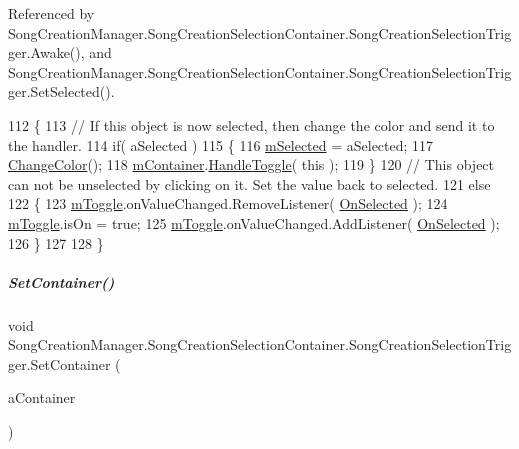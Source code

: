 Referenced by Song\+Creation\+Manager.\+Song\+Creation\+Selection\+Container.\+Song\+Creation\+Selection\+Trigger.\+Awake(), and Song\+Creation\+Manager.\+Song\+Creation\+Selection\+Container.\+Song\+Creation\+Selection\+Trigger.\+Set\+Selected().


\begin{DoxyCode}
112             \{
113                 \textcolor{comment}{// If this object is now selected, then change the color and send it to the handler.}
114                 \textcolor{keywordflow}{if}( aSelected )
115                 \{
116                     \hyperlink{group___s_c_m_nest_class_a1a8086defe08acc773bdc9385a9f66d2}{mSelected} = aSelected;
117                     \hyperlink{group___s_c_m_nest_class_a26bd7667a86c8dc85429a5e4798dd30a}{ChangeColor}();
118                     \hyperlink{group___s_c_m_nest_class_aae8ebcbfe18ad8706d11edac54f2da87}{mContainer}.\hyperlink{group___s_c_m_nest_class_a534fec983fb7e5a7f948513672aa64b4}{HandleToggle}( \textcolor{keyword}{this} );
119                 \}
120                 \textcolor{comment}{// This object can not be unselected by clicking on it. Set the value back to selected.}
121                 \textcolor{keywordflow}{else}
122                 \{
123                     \hyperlink{group___s_c_m_nest_class_ad548c27e148377da02160715a0aca9ee}{mToggle}.onValueChanged.RemoveListener( \hyperlink{group___s_c_m_nest_class_a6477d6c5056af7998063e90e282b67ae}{OnSelected} );
124                     \hyperlink{group___s_c_m_nest_class_ad548c27e148377da02160715a0aca9ee}{mToggle}.isOn = \textcolor{keyword}{true};
125                     \hyperlink{group___s_c_m_nest_class_ad548c27e148377da02160715a0aca9ee}{mToggle}.onValueChanged.AddListener( \hyperlink{group___s_c_m_nest_class_a6477d6c5056af7998063e90e282b67ae}{OnSelected} );
126                 \}
127 
128             \}
\end{DoxyCode}
\mbox{\label{group___s_c_m_nest_class_a29f496763424eb274f35cd29330583ac}} 
\subparagraph{\texorpdfstring{Set\+Container()}{SetContainer()}}
{\footnotesize\ttfamily void Song\+Creation\+Manager.\+Song\+Creation\+Selection\+Container.\+Song\+Creation\+Selection\+Trigger.\+Set\+Container (\begin{DoxyParamCaption}\item[{\hyperlink{group___s_c_m_nest_class_class_song_creation_manager_1_1_song_creation_selection_container}{Song\+Creation\+Selection\+Container}}]{a\+Container }\end{DoxyParamCaption})}



